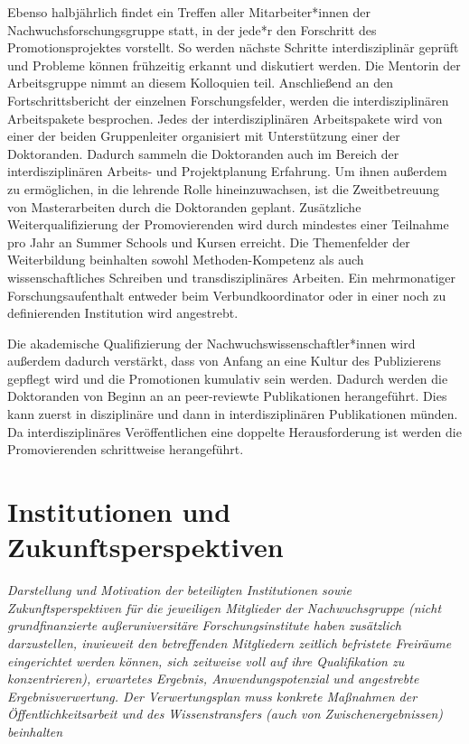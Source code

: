 \documentclass[a4paper,11pt,twoside]{scrartcl}
\begin{document}
Ebenso halbjährlich findet ein Treffen aller Mitarbeiter*innen der Nachwuchsforschungsgruppe statt, in der jede*r den Forschritt des Promotionsprojektes vorstellt. So werden nächste Schritte interdisziplinär geprüft und Probleme können frühzeitig erkannt und diskutiert werden. Die Mentorin der Arbeitsgruppe nimmt an diesem Kolloquien teil. Anschließend an den Fortschrittsbericht der einzelnen Forschungsfelder, werden die interdisziplinären Arbeitspakete besprochen. Jedes der interdisziplinären Arbeitspakete wird von einer der beiden Gruppenleiter organisiert mit Unterstützung einer der Doktoranden. Dadurch sammeln die Doktoranden auch im Bereich der interdisziplinären Arbeits- und Projektplanung Erfahrung. Um ihnen außerdem zu ermöglichen, in die lehrende Rolle hineinzuwachsen, ist die Zweitbetreuung von Masterarbeiten durch die Doktoranden geplant. Zusätzliche Weiterqualifizierung der Promovierenden wird durch mindestes einer Teilnahme pro Jahr an Summer Schools und Kursen erreicht. Die Themenfelder der Weiterbildung beinhalten sowohl Methoden-Kompetenz als auch wissenschaftliches Schreiben und transdisziplinäres Arbeiten. Ein mehrmonatiger Forschungsaufenthalt entweder beim Verbundkoordinator oder in einer noch zu definierenden Institution wird angestrebt.

Die akademische Qualifizierung der Nachwuchswissenschaftler*innen wird außerdem dadurch verstärkt, dass von Anfang an eine Kultur des Publizierens gepflegt wird und die Promotionen kumulativ sein werden. Dadurch werden die Doktoranden von Beginn an an peer-reviewte Publikationen herangeführt. Dies kann zuerst in disziplinäre und dann in interdisziplinären Publikationen münden. Da interdisziplinäres Veröffentlichen eine doppelte Herausforderung ist werden die Promovierenden schrittweise herangeführt.

\section{Institutionen und Zukunftsperspektiven}
\textit{Darstellung und Motivation der beteiligten Institutionen sowie Zukunftsperspektiven für die jeweiligen Mitglieder der Nachwuchsgruppe (nicht grundfinanzierte außeruniversitäre Forschungsinstitute haben zusätzlich darzustellen, inwieweit den betreffenden Mitgliedern zeitlich befristete Freiräume eingerichtet werden können, sich zeitweise voll auf ihre Qualifikation zu konzentrieren), erwartetes Ergebnis, Anwendungspotenzial und angestrebte Ergebnisverwertung. Der Verwertungsplan muss konkrete Maßnahmen der Öffentlichkeitsarbeit und des Wissenstransfers (auch von Zwischenergebnissen) beinhalten}
\end{document}
